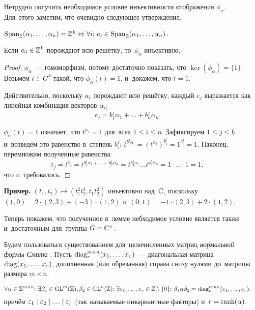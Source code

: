 \documentclass{article}
\begin{document}
Нетрудно получить необходимое условие инъективности отображения $\phi_\alpha$.
Для~этого заметим, что очевидно следующее утверждение.

\begin{statement*}
    $\mathrm{Span}_{\mathbb{Z}}(\alpha_1, \ldots, \alpha_n) = \mathbb{Z}^k \Leftrightarrow \forall i{:}\ e_i \in \mathrm{Span}_{\mathbb{Z}}(\alpha_1, \ldots, \alpha_n)$.
\end{statement*}

\begin{lemma}
    Если $\alpha_i \in \mathbb{Z}^k$ порождают всю решётку, то~$\phi_\alpha$ инъективно.
\end{lemma}

\begin{proof}
    $\phi_\alpha$~— гомоморфизм, потому достаточно показать, что $\ker(\phi_\alpha) = \{1\}$.
    Возьмём $t \in G^k$ такой, что $\phi_\alpha(t) = 1$, и~докажем, что $t = 1$.

    Действительно, поскольку $\alpha_i$ порождают всю решётку, каждый $e_j$ выражается как линейная комбинация векторов $\alpha_i$:
    $$
        e_j = b^j_1 \alpha_1 + \ldots + b^j_n \alpha_n.
    $$

    $\phi_\alpha(t) = 1$ означает, что $t^{\alpha_i} = 1$ для~всех $1 \leq i \leq n$.
    Зафиксируем $1 \leq j \leq k$ и~возведём это равенство в~степень $b^j_i$: $t^{b^j_i \alpha_i} = (t^{\alpha_i})^{b^j_i} = 1^{b^j_i} = 1$.
    Наконец, перемножим полученные равенства:
    $$
        t_j = t^{e_j} = t^{b^j_1 \alpha_1 + \ldots + b^j_n \alpha_n} = t^{b^j_1 \alpha_1} \ldots t^{b^j_n \alpha_n} = 1 \cdot \ldots \cdot 1 = 1,
    $$
    что и~требовалось.
\end{proof}

\noindent\textbf{Пример.} $(t_1, t_2) \mapsto (t_1^2 t_2^3, t_1 t_2^2)$ инъективно над~$\mathbb{C}$,
поскольку $(1, 0) = 2 \cdot (2, 3) + (-3) \cdot (1, 2)$ и~$(0, 1) = -1 \cdot (2, 3) + 2 \cdot (1, 2)$.
\medskip

Теперь покажем, что полученное в~лемме небходимое условие является также и~достаточным для~группы $G = \mathbb{C}^\times$.

Будем пользоваться существованием для~целочисленных матриц \textit{нормальной формы Смита} \cite{Smth60}.
Пусть $\mathrm{diag}^{m \times n}_r(x_1, \ldots, x_r)$~— диагональная матрица $\mathrm{diag}(x_1, \ldots, x_r)$,
дополненная (или обрезанная) справа снизу нулями до~матрицы размера $m \times n$.

\begin{theorem*}
    $$
        \forall \alpha \in \mathbb{Z}^{m \times n}{:}\
        \exists \beta_1 \in \mathrm{GL}^m(\mathbb{Z}), \beta_2 \in \mathrm{GL}^n(\mathbb{Z}){:} \
        \exists \varepsilon_1, \ldots, \varepsilon_r \in \mathbb{Z} \setminus \{0\}{:} \
        \beta_1 \alpha \beta_2 = \mathrm{diag}^{m \times n}_r(\varepsilon_1, \ldots, \varepsilon_r),
    $$
    причём $\varepsilon_1 \mid \varepsilon_2 \mid \ldots \mid \varepsilon_r$ (так называемые инвариантные факторы) и~$r = \mathrm{rank}(\alpha)$.
\end{theorem*}
\end{document}
